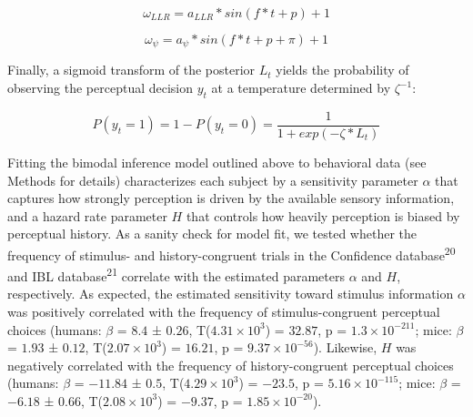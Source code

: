 \documentclass[
]{article}
\begin{document}
\begin{equation}
\omega_{LLR} = a_{LLR} * sin(f * t + p) + 1
\end{equation}

\begin{equation}
\omega_{\psi} = a_{\psi} * sin(f * t + p + \pi) + 1
\end{equation}

Finally, a sigmoid transform of the posterior \(L_t\) yields the
probability of observing the perceptual decision \(y_t\) at a
temperature determined by \(\zeta^{-1}\):

\begin{equation}
P(y_t = 1) = 1 - P(y_t = 0) = \frac{1}{1 + exp(-\zeta * L_t)}
\end{equation}

Fitting the bimodal inference model outlined above to behavioral data
(see Methods for details) characterizes each subject by a sensitivity
parameter \(\alpha\) that captures how strongly perception is driven by
the available sensory information, and a hazard rate parameter \(H\)
that controls how heavily perception is biased by perceptual history. As
a sanity check for model fit, we tested whether the frequency of
stimulus- and history-congruent trials in the Confidence
database\textsuperscript{20} and IBL database\textsuperscript{21}
correlate with the estimated parameters \(\alpha\) and \(H\),
respectively. As expected, the estimated sensitivity toward stimulus
information \(\alpha\) was positively correlated with the frequency of
stimulus-congruent perceptual choices (humans: \(\beta\) = \(8.4\) ±
\(0.26\), T(\(\ensuremath{4.31\times 10^{3}}\)) = \(32.87\), p =
\(\ensuremath{1.3\times 10^{-211}}\); mice: \(\beta\) = \(1.93\) ±
\(0.12\), T(\(\ensuremath{2.07\times 10^{3}}\)) = \(16.21\), p =
\(\ensuremath{9.37\times 10^{-56}}\)). Likewise, \(H\) was negatively
correlated with the frequency of history-congruent perceptual choices
(humans: \(\beta\) = \(-11.84\) ± \(0.5\),
T(\(\ensuremath{4.29\times 10^{3}}\)) = \(-23.5\), p =
\(\ensuremath{5.16\times 10^{-115}}\); mice: \(\beta\) = \(-6.18\) ±
\(0.66\), T(\(\ensuremath{2.08\times 10^{3}}\)) = \(-9.37\), p =
\(\ensuremath{1.85\times 10^{-20}}\)).
\end{document}
